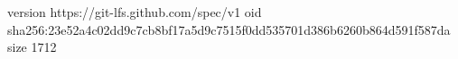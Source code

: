 version https://git-lfs.github.com/spec/v1
oid sha256:23e52a4c02dd9c7cb8bf17a5d9c7515f0dd535701d386b6260b864d591f587da
size 1712
